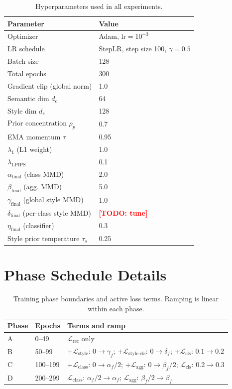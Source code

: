 \documentclass[10pt]{article}
\newcommand{\todo}[1]{\textcolor{red}{\textbf{[TODO: #1]}}}
\begin{document}
\begin{table}[h]
\centering
\caption{Hyperparameters used in all experiments.}
\label{tab:hyperparams}
\begin{tabular}{ll}
\toprule
Parameter & Value \\
\midrule
Optimizer & Adam, $\mathrm{lr}=10^{-3}$ \\
LR schedule & StepLR, step size 100, $\gamma=0.5$ \\
Batch size & 128 \\
Total epochs & 300 \\
Gradient clip (global norm) & 1.0 \\
Semantic dim $d_c$ & 64 \\
Style dim $d_s$ & 128 \\
Prior concentration $\rho_p$ & 0.7 \\
EMA momentum $\tau$ & 0.95 \\
$\lambda_1$ (L1 weight) & 1.0 \\
$\lambda_{\mathrm{LPIPS}}$ & 0.1 \\
$\alpha_{\mathrm{final}}$ (class MMD) & 2.0 \\
$\beta_{\mathrm{final}}$ (agg. MMD) & 5.0 \\
$\gamma_{\mathrm{final}}$ (global style MMD) & 1.0 \\
$\delta_{\mathrm{final}}$ (per-class style MMD) & \todo{tune} \\
$\eta_{\mathrm{final}}$ (classifier) & 0.3 \\
Style prior temperature $\tau_s$ & 0.25 \\
\bottomrule
\end{tabular}
\end{table}

\section{Phase Schedule Details}
\label{app:schedule}

\begin{table}[h]
\centering
\caption{Training phase boundaries and active loss terms.
         Ramping is linear within each phase.}
\label{tab:phases}
\begin{tabular}{lll}
\toprule
Phase & Epochs & Terms and ramp \\
\midrule
A & 0--49 &
  $\mathcal{L}_{\mathrm{rec}}$ only \\
B & 50--99 &
  $+\mathcal{L}_{\mathrm{style}}$: $0\to\gamma_f$;
  $+\mathcal{L}_{\mathrm{style\text{-}cls}}$: $0\to\delta_f$;
  $+\mathcal{L}_{\mathrm{cls}}$: $0.1\to0.2$ \\
C & 100--199 &
  $+\mathcal{L}_{\mathrm{class}}$: $0\to\alpha_f/2$;
  $+\mathcal{L}_{\mathrm{agg}}$: $0\to\beta_f/2$;
  $\mathcal{L}_{\mathrm{cls}}$: $0.2\to0.3$ \\
D & 200--299 &
  $\mathcal{L}_{\mathrm{class}}$: $\alpha_f/2\to\alpha_f$;
  $\mathcal{L}_{\mathrm{agg}}$: $\beta_f/2\to\beta_f$ \\
\bottomrule
\end{tabular}
\end{table}
\end{document}
